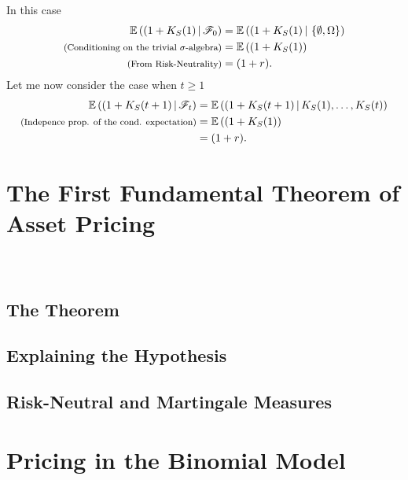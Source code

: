 \documentclass{beamer}
\numberwithin{equation}{section}
\begin{document}
\begin{frame}\frametitle{{\normalsize \secname} \\ {\large \subsecname}}
    \begingroup
    \footnotesize
    In this case
    \begin{align}
        \mathbb{E}\left((1 + K_S(1)\,|\,\mathscr{F}_0\right) &= \mathbb{E}\left((1 + K_S(1)\,|\,\left\{\emptyset, \Omega\right\}\right) \\
        \text{{\footnotesize (Conditioning on the trivial $\sigma$-algebra)}} &= \mathbb{E}\left((1 + K_S(1)\right) \\
        \text{{\footnotesize (From Risk-Neutrality)}}&= (1 + r).
    \end{align}
    Let me now consider the case when $t \geq 1$
    \begin{align}
        \mathbb{E}\left((1 + K_S(t + 1)\,|\,\mathscr{F}_t\right) &= \mathbb{E}\left((1 + K_S(t + 1)\,|\,K_S(1),\ldots,K_S(t)\right) \\
        \text{{\footnotesize (Indepence prop. of the cond. expectation)}} &= \mathbb{E}\left((1 + K_S(1)\right) \\
        &= (1 + r).
    \end{align}
    \endgroup
\end{frame}

\section{The First Fundamental Theorem of Asset Pricing}

\begin{frame}\frametitle{{\normalsize \secname} \\ {\large \subsecname}}
\end{frame}

\subsection{The Theorem}
\subsection{Explaining the Hypothesis}
\subsection{Risk-Neutral and Martingale Measures}

\section{Pricing in the Binomial Model}
\end{document}

